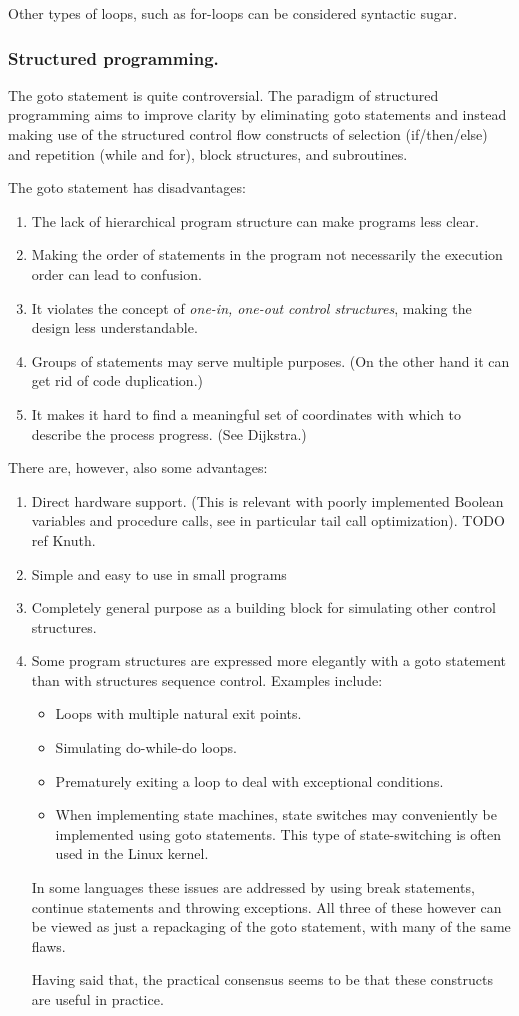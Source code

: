 Other types of loops, such as for-loops can be considered syntactic sugar.
\subsubsection{Structured programming.}  
The goto statement is quite controversial. The paradigm of structured programming aims to improve clarity by eliminating goto statements and instead making use of the structured control flow constructs of selection (if/then/else) and repetition (while and for), block structures, and subroutines.

The goto statement has disadvantages:
\begin{enumerate}
\item The lack of hierarchical program structure can make programs less clear.
\item Making the order of statements in the program not necessarily the execution order can lead to confusion.
\item It violates the concept of \textit{one-in, one-out control structures}, making the design less understandable.
\item Groups of statements may serve multiple purposes. (On the other hand it can get rid of code duplication.)
\item It makes it hard to find a meaningful set of coordinates with which to describe the process progress. (See Dijkstra.)
\end{enumerate}


There are, however, also some advantages:
\begin{enumerate}
\item Direct hardware support. (This is relevant with poorly implemented Boolean variables and procedure calls, see in particular tail call optimization). TODO ref Knuth.
\item Simple and easy to use in small programs
\item Completely general purpose as a building block for simulating other control structures.
\item Some program structures are expressed more elegantly with a goto statement than with structures sequence control. Examples include:
\begin{itemize}
\item Loops with multiple natural exit points.
\item Simulating do-while-do loops.
\item Prematurely exiting a loop to deal with exceptional conditions.
\item When implementing state machines, state switches may conveniently be implemented using goto statements. This type of state-switching is often used in the Linux kernel.
\end{itemize}
In some languages these issues are addressed by using break statements, continue statements and throwing exceptions. All three of these however can be viewed as just a repackaging of the goto statement, with many of the same flaws.

Having said that, the practical consensus seems to be that these constructs are useful in practice.
\end{enumerate}

